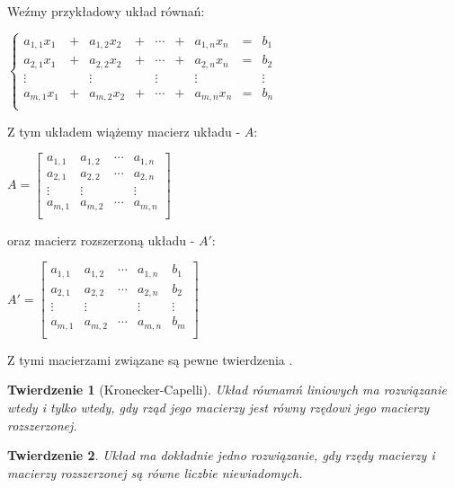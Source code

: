 \documentclass[a4paper,10pt]{article}
\newtheorem{theorem}{Twierdzenie}
\begin{document}
Weźmy przykładowy układ równań:
\begin{center}
$ \left \{ \begin{array}{ccccccccc}
		a_{1,1}x_{1} & + & a_{1,2}x_{2} & + & \cdots & + & a_{1,n}x_{n} & = & b_{1}\\
		a_{2,1}x_{1} & + & a_{2,2}x_{2} & + & \cdots & + & a_{2,n}x_{n} & = & b_{2}\\
		\vdots & & \vdots & &  \vdots & & \vdots & & \vdots \\
		a_{m,1}x_{1} & + & a_{m,2}x_{2} & + & \cdots & + & a_{m,n}x_{n} & = & b_{n}\\
       \end{array} \right. $
\end{center}
Z tym układem wiążemy macierz układu - $A$:
\begin{center}
$A = \left[ \begin{array}{ccccccccc}
		a_{1,1} & a_{1,2} & \cdots & a_{1,n}\\
		a_{2,1} & a_{2,2} & \cdots & a_{2,n}\\
		\vdots  &  \vdots &        & \vdots \\
		a_{m,1} & a_{m,2} & \cdots & a_{m,n}\\
       \end{array} \right] $
\end{center}
oraz macierz rozszerzoną układu - $A'$:
\begin{center}
$A' = \left[ \begin{array}{ccccccccc}
		a_{1,1} & a_{1,2} & \cdots & a_{1,n} & b_1\\
		a_{2,1} & a_{2,2} & \cdots & a_{2,n} & b_2\\
		\vdots  &  \vdots &        & \vdots  & \vdots \\
		a_{m,1} & a_{m,2} & \cdots & a_{m,n} & b_m\\
       \end{array} \right] $
\end{center}

Z tymi macierzami związane są pewne twierdzenia \cite{EK}.
\begin{theorem}[Kronecker-Capelli]
	Układ równamń liniowych ma rozwiązanie wtedy i tylko wtedy, gdy rząd jego macierzy jest równy rzędowi jego macierzy rozszerzonej.
\end{theorem}
\begin{theorem}
	Układ ma dokładnie jedno rozwiązanie, gdy rzędy macierzy i macierzy rozszerzonej są równe liczbie niewiadomych.
\end{theorem}
\end{document}
